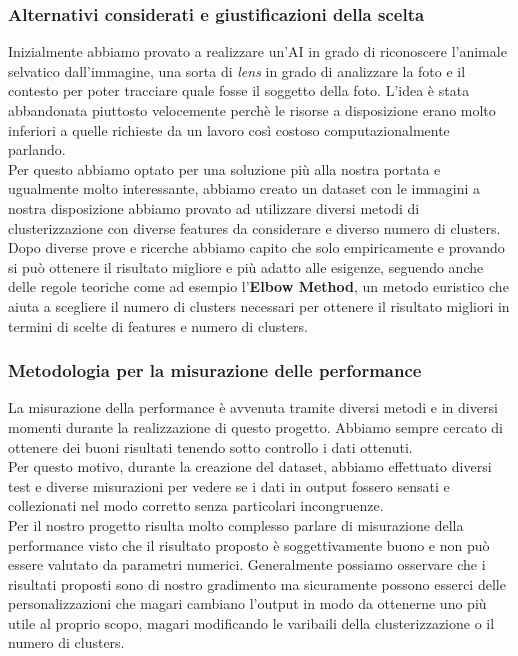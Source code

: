 \documentclass[12pt,a4paper,twoside]{article}
\begin{document}
\subsubsection{Alternativi considerati e giustificazioni della scelta}
Inizialmente abbiamo provato a realizzare un'AI in grado di riconoscere l'animale selvatico 
dall'immagine, una sorta di \textit{lens} in grado di analizzare la foto e il contesto per poter 
tracciare quale fosse il soggetto della foto. L'idea è stata abbandonata piuttosto velocemente 
perchè le risorse a disposizione erano molto inferiori a quelle richieste da un lavoro così 
costoso computazionalmente parlando.\\
Per questo abbiamo optato per una soluzione più alla nostra portata e ugualmente molto 
interessante, abbiamo creato un dataset con le immagini a nostra disposizione abbiamo provato 
ad utilizzare diversi metodi di clusterizzazione con diverse features da considerare e diverso 
numero di clusters.\\
Dopo diverse prove e ricerche abbiamo capito che solo empiricamente e provando si può ottenere 
il risultato migliore e più adatto alle esigenze, seguendo anche delle regole teoriche come ad 
esempio l'\textbf{Elbow Method}, un metodo euristico che aiuta a scegliere il numero di 
clusters necessari per ottenere il risultato migliori in termini di scelte di features e numero 
di clusters.\\
\subsubsection{Metodologia per la misurazione delle performance}
La misurazione della performance è avvenuta tramite diversi metodi e in diversi momenti durante la 
realizzazione di questo progetto. Abbiamo sempre cercato di ottenere dei buoni risultati tenendo 
sotto controllo i dati ottenuti.\\
Per questo motivo, durante la creazione del dataset, abbiamo effettuato diversi test e diverse 
misurazioni per vedere se i dati in output fossero sensati e collezionati nel modo corretto senza 
particolari incongruenze.\\
Per il nostro progetto risulta molto complesso parlare di misurazione della performance visto che 
il risultato proposto è soggettivamente buono e non può essere valutato da parametri numerici. 
Generalmente possiamo osservare che i risultati proposti sono di nostro gradimento ma sicuramente 
possono esserci delle personalizzazioni che magari cambiano l'output in modo da ottenerne uno più 
utile al proprio scopo, magari modificando le varibaili della clusterizzazione o il numero di 
clusters.
\end{document}
